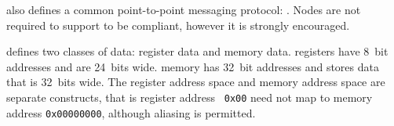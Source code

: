 \newcommand{\mpqrecord}{{\bf \color{blue} Record}\xspace}

\bus also defines a common point-to-point messaging protocol: \proto.
Nodes are not required to support \proto to be \bus compliant, however it is
strongly encouraged.

\proto defines two classes of data: register data and memory data. \proto
registers have 8~bit addresses and are 24~bits wide. \proto memory has 32~bit
addresses and stores data that is 32~bits wide. The register address space and
memory address space are separate constructs, that is register address {\tt
0x00} need not map to memory address {\tt 0x00000000}, although aliasing is
permitted.

